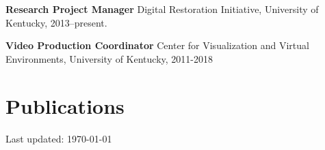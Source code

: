 \documentclass[letterpaper]{article}
\def\footerlink{}
\renewenvironment{itemize}{
  \begin{list}{}{
    \setlength{\leftmargin}{1.5em}
  }
}{
  \end{list}
}
\begin{document}
\begin{itemize}
\item \textbf{Research Project Manager} Digital Restoration Initiative, University of Kentucky, 2013--present.
\item \textbf{Video Production Coordinator} Center for Visualization and Virtual Environments, University of Kentucky, 2011-2018
\end{itemize}


\section*{Publications}
\nocite{*}
\printbibliography[keyword={csp}, heading=none]

%
%
%

\bigskip

\begin{center}
  \begin{footnotesize}
    Last updated: \today \\
    \href{\footerlink}{\texttt{\footerlink}}
  \end{footnotesize}
\end{center}
\end{document}
